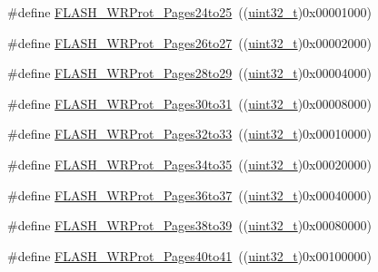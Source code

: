\begin{DoxyCompactItemize}
\#define \hyperlink{group___option___bytes___write___protection_gac36c4a402c77b28f46451e97dc3632f7}{F\+L\+A\+S\+H\+\_\+\+W\+R\+Prot\+\_\+\+Pages24to25}~((\hyperlink{_p_e___types_8h_a33594304e786b158f3fb30289278f5af}{uint32\+\_\+t})0x00001000)
\item 
\#define \hyperlink{group___option___bytes___write___protection_ga92c8a9f8b6875fccb072df795eff5e7e}{F\+L\+A\+S\+H\+\_\+\+W\+R\+Prot\+\_\+\+Pages26to27}~((\hyperlink{_p_e___types_8h_a33594304e786b158f3fb30289278f5af}{uint32\+\_\+t})0x00002000)
\item 
\#define \hyperlink{group___option___bytes___write___protection_gae42c20bedcbaf926c7c49f51a7eea63f}{F\+L\+A\+S\+H\+\_\+\+W\+R\+Prot\+\_\+\+Pages28to29}~((\hyperlink{_p_e___types_8h_a33594304e786b158f3fb30289278f5af}{uint32\+\_\+t})0x00004000)
\item 
\#define \hyperlink{group___option___bytes___write___protection_gaabe41461f613c6eb37c782295ad9f90f}{F\+L\+A\+S\+H\+\_\+\+W\+R\+Prot\+\_\+\+Pages30to31}~((\hyperlink{_p_e___types_8h_a33594304e786b158f3fb30289278f5af}{uint32\+\_\+t})0x00008000)
\item 
\#define \hyperlink{group___option___bytes___write___protection_ga86aa121a8917e58ad6bfdf98ba873d36}{F\+L\+A\+S\+H\+\_\+\+W\+R\+Prot\+\_\+\+Pages32to33}~((\hyperlink{_p_e___types_8h_a33594304e786b158f3fb30289278f5af}{uint32\+\_\+t})0x00010000)
\item 
\#define \hyperlink{group___option___bytes___write___protection_gaa5fee32ae0631b81413414f8e716868b}{F\+L\+A\+S\+H\+\_\+\+W\+R\+Prot\+\_\+\+Pages34to35}~((\hyperlink{_p_e___types_8h_a33594304e786b158f3fb30289278f5af}{uint32\+\_\+t})0x00020000)
\item 
\#define \hyperlink{group___option___bytes___write___protection_gab00dc29c0f12afd25cdb21b6d187ccc9}{F\+L\+A\+S\+H\+\_\+\+W\+R\+Prot\+\_\+\+Pages36to37}~((\hyperlink{_p_e___types_8h_a33594304e786b158f3fb30289278f5af}{uint32\+\_\+t})0x00040000)
\item 
\#define \hyperlink{group___option___bytes___write___protection_gacd33bf5c4a305a271da6035ed19cefc2}{F\+L\+A\+S\+H\+\_\+\+W\+R\+Prot\+\_\+\+Pages38to39}~((\hyperlink{_p_e___types_8h_a33594304e786b158f3fb30289278f5af}{uint32\+\_\+t})0x00080000)
\item 
\#define \hyperlink{group___option___bytes___write___protection_gaaf0c1391987f76b381d26ff4b5142268}{F\+L\+A\+S\+H\+\_\+\+W\+R\+Prot\+\_\+\+Pages40to41}~((\hyperlink{_p_e___types_8h_a33594304e786b158f3fb30289278f5af}{uint32\+\_\+t})0x00100000)
\item 

\end{DoxyCompactItemize}
